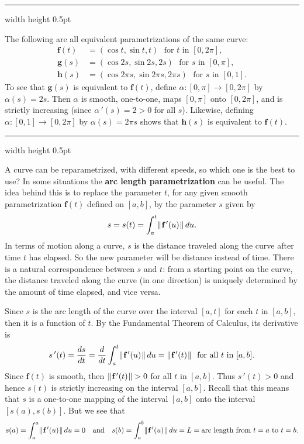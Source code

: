 \vspace{2mm}
\hrule width \textwidth height 0.5pt
\begin{exmp}\label{exmp:paramhelix}
 The following are all equivalent parametrizations of the same curve:
 \begin{align*}
  \textbf{f}(t) &= (\cos t , \sin t , t) \text{~~for $t$ in~$[0,2\pi]$},\\
  \textbf{g}(s) &= (\cos 2s , \sin 2s , 2s) \text{~~for $s$ in~$[0,\pi]$},\\
  \textbf{h}(s) &= (\cos 2\pi s , \sin 2\pi s , 2\pi s) \text{~~for $s$ in~$[0,1]$.}
 \end{align*}
 To see that $\textbf{g}(s)$ is equivalent to $\textbf{f}(t)$, define $\alpha:[0,\pi] \rightarrow [0,2\pi]$ by
 $\alpha(s) = 2s$. Then $\alpha$ is smooth, one-to-one, maps $[0,\pi]$ onto $[0,2\pi]$, and is strictly increasing
 (since $\alpha\,'(s) = 2 > 0$ for all $s$). Likewise, defining $\alpha:[0,1] \rightarrow [0,2\pi]$ by
 $\alpha(s) = 2\pi s$ shows that $\textbf{h}(s)$ is equivalent to $\textbf{f}(t)$.
\end{exmp}
\hrule width \textwidth height 0.5pt
\vskip3mm

A curve can be reparametrized, with different speeds, so which one is the best to use? In some situations
the \textbf{arc length parametrization} can be useful. The idea behind this is to replace the parameter $t$, for any
given smooth parametrization $\textbf{f}(t)$ defined on $[a,b]$, by the parameter $s$ given by
\begin{equation}\label{eqn:arclenfcn}
 s = s(t) = \int_{a}^{t} \lVert\mspace{1mu}\textbf{f}\,'(u)\mspace{1mu}\rVert\,du .
\end{equation}
In terms of motion along a curve, $s$ is the distance traveled along the curve after time $t$ has elapsed.
So the new parameter will be distance instead of time.
There is a natural correspondence between $s$ and $t$: from a starting point on the curve, the distance
traveled along the curve (in one direction) is uniquely determined by the amount of time elapsed, and vice versa.

Since $s$ is the arc length of the curve over the interval $[a,t]$ for each $t$ in $[a,b]$, then it is a function
of $t$. By the Fundamental Theorem of Calculus, its derivative is
\begin{displaymath}
 s\,'(t) = \dfrac{ds}{dt} = \dfrac{d}{dt} \int_{a}^{t} \lVert\mspace{1mu}\textbf{f}\,'(u)\mspace{1mu}\rVert\,du =
 \lVert\mspace{1mu}\textbf{f}\,'(t)\mspace{1mu}\rVert \text{~~for all $t$ in $[a,b]$.}
\end{displaymath}
Since $\textbf{f}(t)$ is smooth, then $\lVert\mspace{1mu}\textbf{f}\,'(t)\mspace{1mu}\rVert > 0$ for all $t$ in $[a,b]$. Thus $s\,'(t) > 0$
and hence $s(t)$ is strictly increasing on the interval $[a,b]$. Recall that this means that $s$ is a one-to-one mapping
of the interval $[a,b]$ onto the interval $[s(a),s(b)]$. But we see that
\begin{displaymath}
 s(a) = \int_{a}^{a} \lVert\mspace{1mu}\textbf{f}\,'(u)\mspace{1mu}\rVert\,du = 0 \quad \text{and} \quad
 s(b) = \int_{a}^{b} \lVert\mspace{1mu}\textbf{f}\,'(u)\mspace{1mu}\rVert\,du = L = \text{arc length from $t = a$ to $t = b$.}
\end{displaymath}

